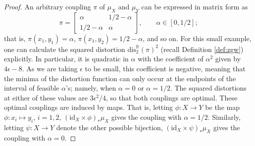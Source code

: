 \documentclass{article}
\theoremstyle{definition}
\newcommand{\R}{\mathbb{R}}
\begin{document}
\begin{proof}
An arbitrary coupling $\pi$ of $\mu_X$ and $\mu_Y$ can be expressed in matrix form as 
\[
\pi = \begin{bmatrix}
\alpha & 1/2 - \alpha \\
1/2 - \alpha & \alpha
\end{bmatrix}, \qquad \alpha \in [0,1/2];
\]
that is, $\pi(x_1,y_1) = \alpha$, $\pi(x_1,y_2) = 1/2-\alpha$, and so on. For this small example, one can calculate the squared distortion $\mathrm{dis}_2^\R(\pi)^2$  (recall Definition \ref{def:zgw}) explicitly. In particular, it is quadratic in $\alpha$ with the coefficient of $\alpha^2$  given by $4 \epsilon - 8$. As we are taking $\epsilon$ to be small, this coefficient is negative, meaning that the minima of the distortion function can only occur at the endpoints of the interval of feasible $\alpha$'s; namely, when $\alpha = 0$ or $\alpha = 1/2$. The squared distortions at either of these values are $3\epsilon^2/4$, so that both couplings are optimal. These optimal couplings are induced by maps. That is, letting $\phi:X \to Y$ be the map $\phi:x_i \mapsto y_i$, $i =1,2$, $(\mathrm{id}_X \times \phi)_\ast \mu_X$ gives the coupling with $\alpha = 1/2$.  Similarly, letting $\psi:X \to Y$ denote the other possible bijection,  $(\mathrm{id}_X \times \psi)_\ast \mu_X$ gives the coupling with $\alpha = 0$. 

%
%
%
%
%
%
%
%
%
%
%
%
%
%
%
%


\end{proof}
\end{document}
